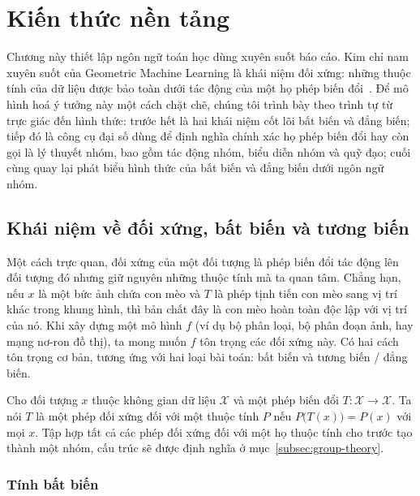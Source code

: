 \section{Kiến thức nền tảng}
\label{sec:kien-thuc-nen}
 
Chương này thiết lập ngôn ngữ toán học dùng xuyên suốt báo cáo. Kim chỉ nam xuyên suốt của Geometric Machine Learning là khái niệm đối xứng: những thuộc tính của dữ liệu được bảo toàn dưới tác động của một họ phép biến đổi~\cite{bronstein2021geometric}. Để mô hình hoá ý tưởng này một cách chặt
chẽ, chúng tôi trình bày theo trình tự từ trực giác đến hình thức: trước hết là
hai khái niệm cốt lõi bất biến và đẳng biến; tiếp đó là công cụ đại số dùng để định
nghĩa chính xác họ phép biến đổi hay còn gọi là lý thuyết nhóm, bao gồm tác động nhóm, biểu diễn nhóm và quỹ đạo; cuối cùng quay lại phát biểu hình thức của bất biến và đẳng biến dưới ngôn ngữ nhóm.

\subsection{Khái niệm về đối xứng, bất biến và tương biến}
\label{subsec:doi-xung-bat-bien}
 
Một cách trực quan, đối xứng của một đối tượng là phép biến đổi tác động
lên đối tượng đó nhưng giữ nguyên những thuộc tính mà ta quan tâm. Chẳng hạn,
nếu $x$ là một bức ảnh chứa con mèo và $T$ là phép tịnh tiến con mèo sang vị trí khác trong khung hình, thì bản chất đây là con mèo
hoàn toàn độc lập với vị trí của nó. Khi xây dựng một mô hình $f$ (ví dụ bộ phân
loại, bộ phân đoạn ảnh, hay mạng nơ-ron đồ thị), ta mong muốn $f$ tôn
trọng các đối xứng này. Có hai cách tôn trọng cơ bản, tương ứng với hai loại
bài toán: bất biến và tương biến / đẳng biến.
 
\begin{definition}
\label{def:doi-xung}
Cho đối tượng $x$ thuộc không gian dữ liệu $\mathcal{X}$ và một phép biến đổi
$T:\mathcal{X}\to\mathcal{X}$. Ta nói $T$ là một phép đối xứng đối với
một thuộc tính $P$ nếu $P\bigl(T(x)\bigr)=P(x)$ với mọi $x$. Tập hợp tất cả các
phép đối xứng đối với một họ thuộc tính cho trước tạo thành một nhóm, cấu trúc sẽ được định nghĩa ở mục~\ref{subsec:group-theory}.
\end{definition}
 
\subsubsection{Tính bất biến}
\label{ssub:invariance}
 
